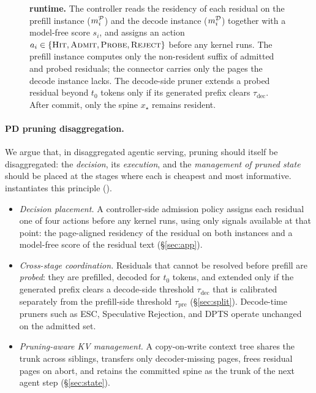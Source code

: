 \begin{figure}[t]
\centering
\resizebox{0.78\textwidth}{!}{}
\caption{\textbf{\sys{} runtime.}
The controller reads the residency of each residual on the prefill instance ($m_i^{\mathcal{P}}$) and the decode instance ($m_i^{\mathcal{D}}$) together with a model-free score $s_i$, and assigns an action $a_i\in\{\textsc{Hit},\textsc{Admit},\textsc{Probe},\textsc{Reject}\}$ before any kernel runs.
The prefill instance computes only the non-resident suffix of admitted and probed residuals; the connector carries only the pages the decode instance lacks.
The decode-side pruner extends a probed residual beyond $t_0$ tokens only if its generated prefix clears $\tau_{\mathrm{dec}}$.
After commit, only the spine $x_\star$ remains resident.}
\label{fig:system}
\end{figure}

\paragraph{PD pruning disaggregation.}
We argue that, in disaggregated agentic serving, pruning should itself be disaggregated: the \emph{decision}, its \emph{execution}, and the \emph{management of pruned state} should be placed at the stages where each is cheapest and most informative.
\sys instantiates this principle ().
\begin{itemize}[leftmargin=*,itemsep=1pt,topsep=2pt]
\item \emph{Decision placement.} A controller-side admission policy assigns each residual one of four actions before any kernel runs, using only signals available at that point: the page-aligned residency of the residual on both instances and a model-free score of the residual text (\S\ref{sec:app}).
\item \emph{Cross-stage coordination.} Residuals that cannot be resolved before prefill are \emph{probed}: they are prefilled, decoded for $t_0$ tokens, and extended only if the generated prefix clears a decode-side threshold $\tau_{\mathrm{dec}}$ that is calibrated separately from the prefill-side threshold $\tau_{\mathrm{pre}}$ (\S\ref{sec:split}). Decode-time pruners such as ESC, Speculative Rejection, and DPTS operate unchanged on the admitted set.
\item \emph{Pruning-aware KV management.} A copy-on-write context tree shares the trunk across siblings, transfers only decoder-missing pages, frees residual pages on abort, and retains the committed spine as the trunk of the next agent step (\S\ref{sec:state}).
\end{itemize}

